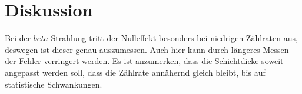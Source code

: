 \section{Diskussion}
\label{sec:Diskussion}

Bei der $beta$-Strahlung tritt der Nulleffekt besonders bei niedrigen Zählraten aus, 
deswegen ist dieser genau auszumessen. Auch hier kann durch längeres Messen der Fehler verringert werden. 
Es ist anzumerken, dass die Schichtdicke soweit angepasst werden soll, dass die Zählrate annähernd 
gleich bleibt, bis auf statistische Schwankungen. 